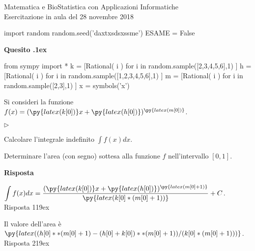 \documentclass[11pt,twoside,a4paper]{article}
\newcommand{\mylabel}[1]{#1\hfill}
\renewenvironment{itemize}
  {\begin{list}{$\triangleright$}{%
   \setlength{\parskip}{0mm}
   \setlength{\topsep}{.4\baselineskip}
   \setlength{\rightmargin}{0mm}
   \setlength{\listparindent}{0mm}
   \setlength{\itemindent}{0mm}
   \setlength{\labelwidth}{2ex}
   \setlength{\itemsep}{.4\baselineskip}
   \setlength{\parsep}{0mm}
   \setlength{\partopsep}{0mm}
   \setlength{\labelsep}{1ex}
   \setlength{\leftmargin}{\labelwidth+\labelsep}
   \let\makelabel\mylabel}}{%
   \end{list}\vspace*{-1.3mm}}
\newcounter{quesito}
\newenvironment{question}{\addtocounter{quesito}{1}\par\textbf{Quesito \thequesito.\kern1ex}}{\vspace{0.5\parskip}}
\newenvironment{answer}{\par\textbf{Risposta\quad}}{\vspace{\parskip}}
\begin{document}
\colorbox{blue!10}{\begin{minipage}{\textwidth}
Matematica e BioStatistica con Applicazioni Informatiche\\
Esercitazione in aula del 28 novembre 2018
\end{minipage}}



\begin{pycode}
import random
random.seed('daxtxsdsxssme')
ESAME = False
\end{pycode}


\begin{question}
\begin{pycode}
from sympy import *
k = [Rational( i ) for i in random.sample([2,3,4,5,6],1) ]
h = [Rational( i ) for i in random.sample([1,2,3,4,5,6],1) ]
m = [Rational( i ) for i in random.sample([2,3],1) ]
x = symbols('x')
\end{pycode}
Si consideri la funzione $f(x) = (\py{latex(k[0])}x+\py{latex(h[0])})^{\py{latex(m[0])}}$.
\begin{itemize}
\item[1.] Calcolare l'integrale indefinito $\displaystyle \int f(x) dx$.
\item[2.] Determinare l'area (con segno) sottesa alla funzione $f$ nell'intervallo $[0,1]$.
\end{itemize}
\begin{answer}

{\color{blue}
$\displaystyle \int f(x) dx = \frac{(\py{latex(k[0])}x+\py{latex(h[0])})^{\py{latex(m[0]+1)}}}{\py{latex(k[0]*(m[0]+1))}} + C$.
\hfill Risposta 1\kern19ex}

\smallskip
{\color{blue} Il valore dell'area è $\py{latex((h[0]**(m[0]+1)-(h[0]+k[0])**(m[0]+1))/(k[0]*(m[0]+1)))}$.
\hfill Risposta 2\kern19ex}

\end{answer}
\end{question}
\end{document}
